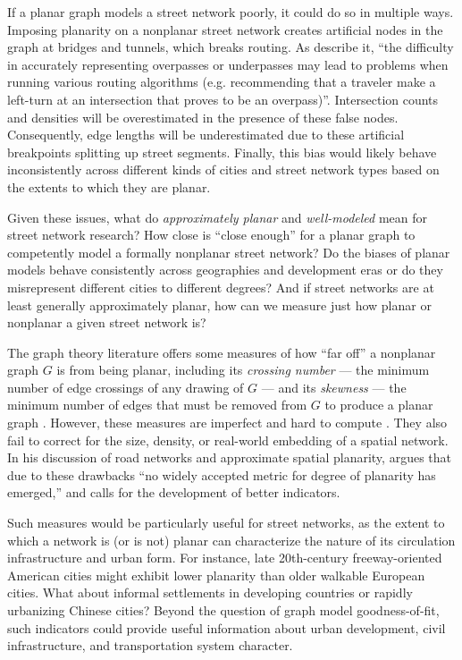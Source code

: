 \documentclass[Afour,sageh,times]{sagej}
\begin{document}
If a planar graph models a street network poorly, it could do so in multiple ways. Imposing planarity on a nonplanar street network creates artificial nodes in the graph at bridges and tunnels, which breaks routing. As \citet[p.~6]{kwan_review_1996} describe it, \enquote{the difficulty in accurately representing overpasses or underpasses may lead to problems when running various routing algorithms (e.g. recommending that a traveler make a left-turn at an intersection that proves to be an overpass)}. Intersection counts and densities will be overestimated in the presence of these false nodes. Consequently, edge lengths will be underestimated due to these artificial breakpoints splitting up street segments. Finally, this bias would likely behave inconsistently across different kinds of cities and street network types based on the extents to which they are planar.

Given these issues, what do \emph{approximately planar} and \emph{well-modeled} mean for street network research? How close is \enquote{close enough} for a planar graph to competently model a formally nonplanar street network? Do the biases of planar models behave consistently across geographies and development eras or do they misrepresent different cities to different degrees? And if street networks are at least generally approximately planar, how can we measure just how planar or nonplanar a given street network is?

The graph theory literature offers some measures of how \enquote{far off} a nonplanar graph $G$ is from being planar, including its \emph{crossing number} --- the minimum number of edge crossings of any drawing of $G$ --- and its \emph{skewness} --- the minimum number of edges that must be removed from $G$ to produce a planar graph \citep{liebers_planarizing_2001,chimani_non-planar_2009}. However, these measures are imperfect and hard to compute \citep{szekely_successful_2004,chimani_vertex_2012}. They also fail to correct for the size, density, or real-world embedding of a spatial network. In his discussion of road networks and approximate spatial planarity, \citet[p.~133]{newman_networks:_2010} argues that due to these drawbacks \enquote{no widely accepted metric for degree of planarity has emerged,} and calls for the development of better indicators.

Such measures would be particularly useful for street networks, as the extent to which a network is (or is not) planar can characterize the nature of its circulation infrastructure and urban form. For instance, late 20th-century freeway-oriented American cities might exhibit lower planarity than older walkable European cities. What about informal settlements in developing countries or rapidly urbanizing Chinese cities? Beyond the question of graph model goodness-of-fit, such indicators could provide useful information about urban development, civil infrastructure, and transportation system character.
\end{document}
